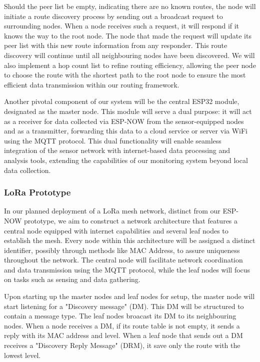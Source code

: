 Should the peer list be empty, indicating there are no known routes, the node will initiate a route discovery process by sending out a broadcast request to surrounding nodes. When a node receives such a request, it will respond if it knows the way to the root node. The node that made the request will update its peer list with this new route information from any responder. This route discovery will continue until all neighbouring nodes have been discovered. We will also implement a hop count list to refine routing efficiency, allowing the peer node to choose the route with the shortest path to the root node to ensure the most efficient data transmission within our routing framework.

Another pivotal component of our system will be the central ESP32 module, designated as the master node. This module will serve a dual purpose: it will act as a receiver for data collected via ESP-NOW from the sensor-equipped nodes and as a transmitter, forwarding this data to a cloud service or server via WiFi using the MQTT protocol. This dual functionality will enable seamless integration of the sensor network with internet-based data processing and analysis tools, extending the capabilities of our monitoring system beyond local data collection.


\subsubsection{LoRa Prototype}

In our planned deployment of a LoRa mesh network, distinct from our ESP-NOW prototype, we aim to construct a network architecture that features a central node equipped with internet capabilities and several leaf nodes to establish the mesh. Every node within this architecture will be assigned a distinct identifier, possibly through methods like MAC Address, to assure uniqueness throughout the network. The central node will facilitate network coordination and data transmission using the MQTT protocol, while the leaf nodes will focus on tasks such as sensing and data gathering.

Upon starting up the master nodes and leaf nodes for setup, the master node will start listening for a "Discovery message" (DM). This DM will be structured to contain a message type. The leaf nodes broacast its DM to its neighbouring nodes. When a node receives a DM, if its route table is not empty, it sends a reply with its MAC address and level. When a leaf node that sends out a DM receives a "Discovery Reply Message" (DRM), it save only the route with the lowest level.

